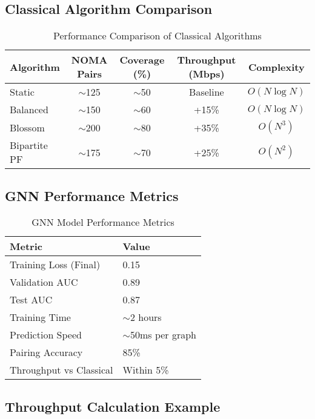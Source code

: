 \documentclass[11pt,a4paper]{article}
\begin{document}
\subsection{Classical Algorithm Comparison}

\begin{table}[H]
\centering
\begin{tabular}{@{}lcccc@{}}
\toprule
\textbf{Algorithm} & \textbf{NOMA Pairs} & \textbf{Coverage (\%)} & \textbf{Throughput (Mbps)} & \textbf{Complexity} \\
\midrule
Static & $\sim$125 & $\sim$50 & Baseline & $O(N \log N)$ \\
Balanced & $\sim$150 & $\sim$60 & +15\% & $O(N \log N)$ \\
Blossom & $\sim$200 & $\sim$80 & +35\% & $O(N^3)$ \\
Bipartite PF & $\sim$175 & $\sim$70 & +25\% & $O(N^2)$ \\
\bottomrule
\end{tabular}
\caption{Performance Comparison of Classical Algorithms}
\label{tab:classical_performance}
\end{table}

\subsection{GNN Performance Metrics}

\begin{table}[H]
\centering
\begin{tabular}{@{}ll@{}}
\toprule
\textbf{Metric} & \textbf{Value} \\
\midrule
Training Loss (Final) & 0.15 \\
Validation AUC & 0.89 \\
Test AUC & 0.87 \\
Training Time & $\sim$2 hours \\
Prediction Speed & $\sim$50ms per graph \\
Pairing Accuracy & 85\% \\
Throughput vs Classical & Within 5\% \\
\bottomrule
\end{tabular}
\caption{GNN Model Performance Metrics}
\label{tab:gnn_performance}
\end{table}

\subsection{Throughput Calculation Example}
\end{document}
